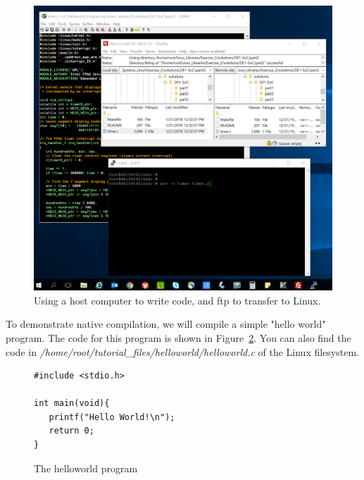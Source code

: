 \documentclass[11pt, twoside, pdftex]{article}
\begin{document}
\begin{figure}[H]
   \begin{center}
       \includegraphics[width=\textwidth]{figures/dev_setup_2.png}
   \end{center}
   \caption{Using a host computer to write code, and ftp to transfer to Linux.}
	\label{fig:dev_setup}
\end{figure}

To demonstrate native compilation, we will compile a simple "hello world" program. The code 
for this program is shown in Figure~\ref{fig:helloworld_code}. You can also find the code 
in \textit{/home/root/tutorial\_files/helloworld/helloworld.c} of the Linux filesystem.

\lstset{language=C,numbers=left}
\begin{figure}[H]
\begin{center}
\begin{minipage}[t]{16 cm}
\begin{lstlisting}
#include <stdio.h>

int main(void){
   printf("Hello World!\n");
   return 0;
}
\end{lstlisting}
\end{minipage}
\end{center}
\vspace{-0.33in}\caption{The helloworld program}
\label{fig:helloworld_code}
\end{figure}
\end{document}
